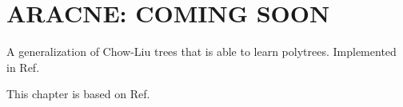\chapter{ARACNE: COMING SOON}
\label{ch-aracne}

A generalization
of Chow-Liu trees
that is able to learn 
polytrees. Implemented 
in \bnlearn Ref.\cite{bnlearn}

This chapter
is based on
Ref.\cite{aracne}
